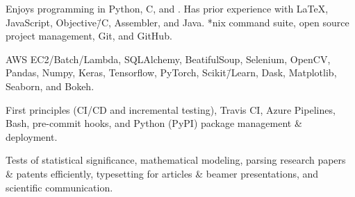 
{%
	Enjoys programming in Python, C, and \CPP\@.
	Has prior experience with \LaTeX, JavaScript, Objective\=/C, Assembler, and Java. *nix command suite, open source project management, Git, and GitHub.
}
\vspace{0.5em}

{%
	AWS EC2/\nsp{}Batch/\nsp{}Lambda, SQLAlchemy, BeatifulSoup, Selenium, OpenCV, Pandas, Numpy, Keras, Tensorflow, PyTorch, Scikit\=/Learn, Dask, Matplotlib, Seaborn, and Bokeh.
}
\vspace{0.5em}

{%
	First principles (CI/CD and incremental testing), Travis CI, Azure Pipelines, Bash, pre-commit hooks, and Python (PyPI) package management \& deployment.
}
\vspace{0.5em}

{%
	Tests of statistical significance, mathematical modeling, parsing research papers \& patents efficiently, typesetting for articles \& beamer presentations, and scientific communication.
}


